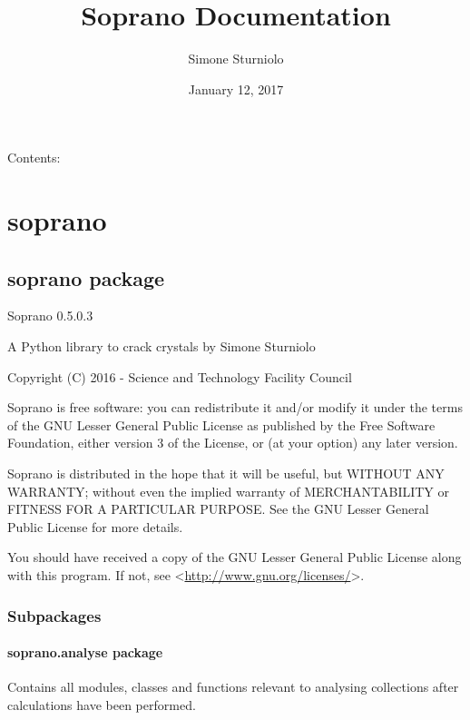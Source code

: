 \documentclass[letterpaper,10pt,english]{sphinxmanual}
\title{Soprano Documentation}
\date{January 12, 2017}
\author{Simone Sturniolo}
\begin{document}
\maketitle
\tableofcontents
{}\label{index::doc}


Contents:


\chapter{soprano}
\label{doctree/modules:welcome-to-soprano-s-documentation-release-release}\label{doctree/modules:soprano}\label{doctree/modules::doc}

\section{soprano package}
\label{doctree/soprano:module-soprano}\label{doctree/soprano::doc}\label{doctree/soprano:soprano-package}
Soprano 0.5.0.3

A Python library to crack crystals
by Simone Sturniolo

Copyright (C) 2016 - Science and Technology Facility Council

Soprano is free software: you can redistribute it and/or modify
it under the terms of the GNU Lesser General Public License as published by
the Free Software Foundation, either version 3 of the License, or
(at your option) any later version.

Soprano is distributed in the hope that it will be useful,
but WITHOUT ANY WARRANTY; without even the implied warranty of
MERCHANTABILITY or FITNESS FOR A PARTICULAR PURPOSE.  See the
GNU Lesser General Public License for more details.

You should have received a copy of the GNU Lesser General Public License
along with this program.  If not, see \textless{}\href{http://www.gnu.org/licenses/}{http://www.gnu.org/licenses/}\textgreater{}.


\subsection{Subpackages}
\label{doctree/soprano:subpackages}

\subsubsection{soprano.analyse package}
\label{doctree/soprano.analyse:module-soprano.analyse}\label{doctree/soprano.analyse:soprano-analyse-package}\label{doctree/soprano.analyse::doc}
Contains all modules, classes and functions relevant
to analysing collections after calculations have been performed.
\end{document}

